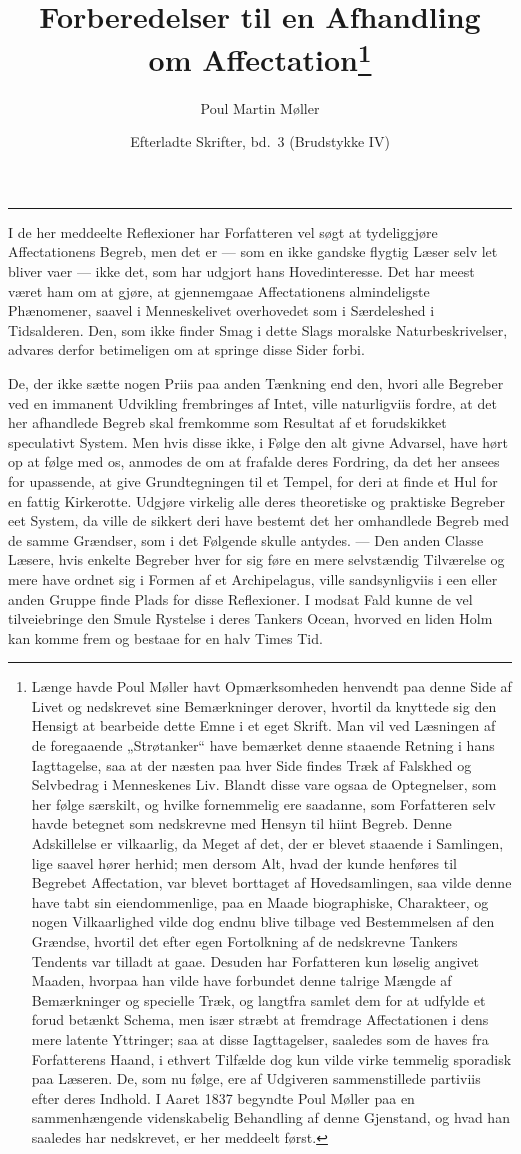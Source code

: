\documentclass[12pt]{article}
\title{\textbf{Forberedelser til en Afhandling\\[0.2em] om Affectation}\footnote{Længe havde Poul Møller havt Opmærksomheden henvendt paa denne Side af Livet og nedskrevet sine Bemærkninger derover, hvortil da knyttede sig den Hensigt at bearbeide dette Emne i et eget Skrift. Man vil ved Læsningen af de foregaaende „Strøtanker`` have bemærket denne staaende Retning i hans Iagttagelse, saa at der næsten paa hver Side findes Træk af Falskhed og Selvbedrag i Menneskenes Liv. Blandt disse vare ogsaa de Optegnelser, som her følge særskilt, og hvilke fornemmelig ere saadanne, som Forfatteren selv havde betegnet som nedskrevne med Hensyn til hiint Begreb. Denne Adskillelse er vilkaarlig, da Meget af det, der er blevet staaende i Samlingen, lige saavel hører herhid; men dersom Alt, hvad der kunde henføres til Begrebet Affectation, var blevet borttaget af Hovedsamlingen, saa vilde denne have tabt sin eiendommenlige, paa en Maade biographiske, Charakteer, og nogen Vilkaarlighed vilde dog endnu blive tilbage ved Bestemmelsen af den Grændse, hvortil det efter egen Fortolkning af de nedskrevne Tankers Tendents var tilladt at gaae. Desuden har Forfatteren kun løselig angivet Maaden, hvorpaa han vilde have forbundet denne talrige Mængde af Bemærkninger og specielle Træk, og langtfra samlet dem for at udfylde et forud betænkt Schema, men især stræbt at fremdrage Affectationen i dens mere latente Yttringer; saa at disse Iagttagelser, saaledes som de haves fra Forfatterens Haand, i ethvert Tilfælde dog kun vilde virke temmelig sporadisk paa Læseren. De, som nu følge, ere af Udgiveren sammenstillede partiviis efter deres Indhold. I Aaret 1837 begyndte Poul Møller paa en sammenhængende videnskabelig Behandling af denne Gjenstand, og hvad han saaledes har nedskrevet, er her meddeelt først.}}
\author{Poul Martin Møller}
\date{Efterladte Skrifter, bd.\ 3 (Brudstykke IV)}
\newcommand{\opage}[1]{\marginnote{\footnotesize\textit{[#1]}}}
\begin{document}
\maketitle

\begin{center}\rule{0.32\textwidth}{0.4pt}\end{center}
\medskip

\opage{163}I de her meddeelte Reflexioner har Forfatteren vel søgt at tydeliggjøre Affectationens Begreb, men det er --- som en ikke \opage{164}gandske flygtig Læser selv let bliver vaer --- ikke det, som har udgjort hans Hovedinteresse. Det har meest været ham om at gjøre, at gjennemgaae Affectationens almindeligste Phænomener, saavel i Menneskelivet overhovedet som i Særdeleshed i Tidsalderen. Den, som ikke finder Smag i dette Slags moralske Naturbeskrivelser, advares derfor betimeligen om at springe disse Sider forbi.

De, der ikke sætte nogen Priis paa anden Tænkning end den, hvori alle Begreber ved en immanent Udvikling frembringes af Intet, ville naturligviis fordre, at det her afhandlede Begreb skal fremkomme som Resultat af et forudskikket speculativt System. Men hvis disse ikke, i Følge den alt givne Advarsel, have hørt op at følge med os, anmodes de om at frafalde deres Fordring, da det her ansees for upassende, at give Grundtegningen til et Tempel, for deri at finde et Hul for en fattig Kirkerotte. Udgjøre virkelig alle deres theoretiske og praktiske Begreber eet System, da ville de sikkert deri have bestemt det her omhandlede Begreb med de samme Grændser, som i det Følgende skulle antydes. --- Den anden Classe Læsere, hvis enkelte Begreber hver for sig føre en mere selvstændig Tilværelse og mere have ordnet sig i Formen af et Archipelagus, ville sandsynligviis i een eller anden Gruppe finde Plads for disse Reflexioner. I modsat Fald kunne de vel tilveiebringe den Smule Rystelse i deres Tankers Ocean, hvorved en liden Holm kan komme frem og bestaae for en halv Times Tid.
\end{document}
